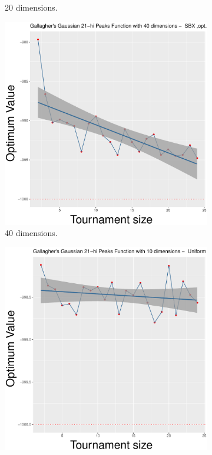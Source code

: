 \begin{figure}[!t]
\begin{subfigure}[b]{0.33\textwidth}
		\caption{20 dimensions.}
	\end{subfigure}
	\begin{subfigure}[b]{0.33\textwidth}
		\centering
		\includegraphics[width=\textwidth]{img/SBX-40D/multimodal_sbx_22_dim_40.pdf}
		\caption{40 dimensions.}
	\end{subfigure}
	\caption{SBX crossover - ($\lambda, \lambda$) scheme.}
	\label{sbx-22-a}
	\begin{subfigure}[b]{0.33\textwidth}
		\centering
		\includegraphics[width=\textwidth]{img/uniform-10D/multimodal_uniform_22_dim_10.pdf}

\end{subfigure}
\end{figure}
